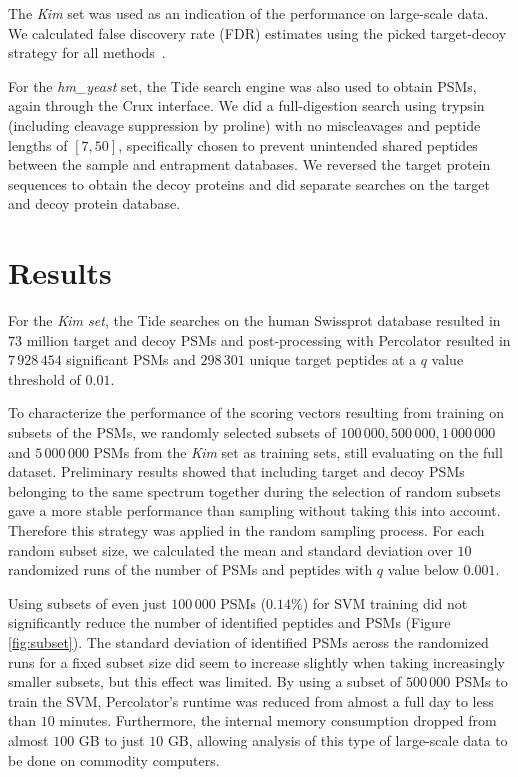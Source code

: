 \documentclass{article}
\begin{document}
The {\em Kim} set was used as an indication of the performance on
large-scale data. We calculated false discovery rate (FDR) estimates
using the picked target-decoy strategy for all
methods~\cite{savitski2015scalable}.

For the {\em hm\_yeast} set, the Tide search engine was also used to
obtain PSMs, again through the Crux interface. We did a full-digestion
search using trypsin (including cleavage suppression by proline) with
no miscleavages and peptide lengths of $[7,50]$, specifically chosen
to prevent unintended shared peptides between the sample and
entrapment databases. We reversed the target protein sequences to
obtain the decoy proteins and did separate searches on the target and
decoy protein database.

\section*{Results}

For the {\em Kim set}, the Tide searches on the human Swissprot
database resulted in $73$ million target and decoy PSMs and
post-processing with Percolator resulted in $7\,928\,454$ significant
PSMs and $298\,301$ unique target peptides at a $q$ value threshold of
$0.01$.

To characterize the performance of the scoring vectors resulting from
training on subsets of the PSMs, we randomly selected subsets of
$100\,000, 500\,000, 1\,000\,000$ and $5\,000\,000$ PSMs from the {\em
  Kim} set as training sets, still evaluating on the full
dataset. Preliminary results showed that including target and decoy
PSMs belonging to the same spectrum together during the selection of
random subsets gave a more stable performance than sampling without
taking this into account. Therefore this strategy was applied in the
random sampling process. For each random subset size, we calculated
the mean and standard deviation over $10$ randomized runs of the
number of PSMs and peptides with $q$ value below $0.001$.

Using subsets of even just $100\,000$ PSMs ($0.14\%$) for SVM training
did not significantly reduce the number of identified peptides and
PSMs (Figure \ref{fig:subset}). The standard deviation of identified
PSMs across the randomized runs for a fixed subset size did seem to
increase slightly when taking increasingly smaller subsets, but this
effect was limited. By using a subset of $500\,000$ PSMs to train the
SVM, Percolator's runtime was reduced from almost a full day to less
than $10$ minutes. Furthermore, the internal memory consumption
dropped from almost $100$ GB to just $10$ GB, allowing analysis of
this type of large-scale data to be done on commodity computers.
\end{document}
